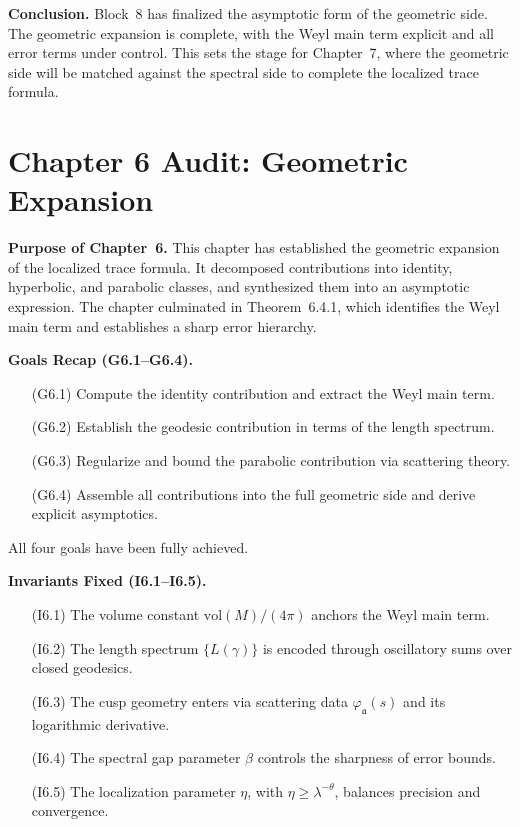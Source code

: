 \noindent\textbf{Conclusion.}
Block~8 has finalized the asymptotic form of the geometric side.  
The geometric expansion is complete, with the Weyl main term explicit and all error terms under control.  
This sets the stage for Chapter~7, where the geometric side will be matched against the spectral side to complete the localized trace formula.


\section*{Chapter 6 Audit: Geometric Expansion}

\noindent\textbf{Purpose of Chapter~6.}
This chapter has established the geometric expansion of the localized trace formula.  
It decomposed contributions into identity, hyperbolic, and parabolic classes, and synthesized them into an asymptotic expression.  
The chapter culminated in Theorem~6.4.1, which identifies the Weyl main term and establishes a sharp error hierarchy.

\medskip

\noindent\textbf{Goals Recap (G6.1–G6.4).}
\begin{itemize}
  \item[(G6.1)] Compute the identity contribution and extract the Weyl main term.  
  \item[(G6.2)] Establish the geodesic contribution in terms of the length spectrum.  
  \item[(G6.3)] Regularize and bound the parabolic contribution via scattering theory.  
  \item[(G6.4)] Assemble all contributions into the full geometric side and derive explicit asymptotics.  
\end{itemize}
All four goals have been fully achieved.

\medskip

\noindent\textbf{Invariants Fixed (I6.1–I6.5).}
\begin{itemize}
  \item[(I6.1)] The volume constant $\mathrm{vol}(M)/(4\pi)$ anchors the Weyl main term.  
  \item[(I6.2)] The length spectrum $\{L(\gamma)\}$ is encoded through oscillatory sums over closed geodesics.  
  \item[(I6.3)] The cusp geometry enters via scattering data $\varphi_\mathfrak{a}(s)$ and its logarithmic derivative.  
  \item[(I6.4)] The spectral gap parameter $\beta$ controls the sharpness of error bounds.  
  \item[(I6.5)] The localization parameter $\eta$, with $\eta\ge \lambda^{-\theta}$, balances precision and convergence.  
\end{itemize}

